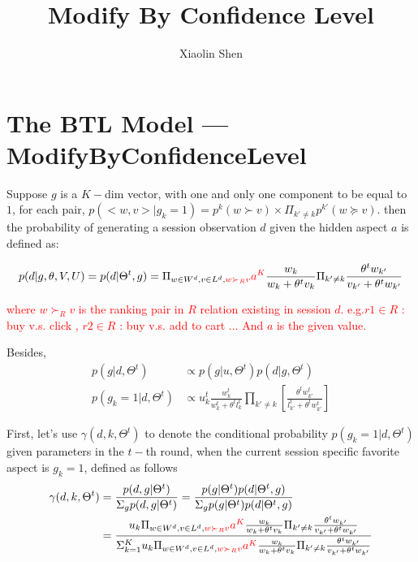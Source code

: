 \documentclass{article}
\title{Modify By Confidence Level}
\author{Xiaolin Shen}
\begin{document}
 

\maketitle


\section{The BTL Model ---ModifyByConfidenceLevel}
 
 Suppose $g$ is a $K-$dim vector, with one and only one component to be equal to $1$, for each pair, $p(<w,v>|g_k=1) = p^k(w\succ v) \times \Pi_{k'\neq k} p^{k'}(w \succeq v)$. then the probability of generating a session observation $d$ given the hidden aspect $a$ is defined as:

\begin{align}\label{equ:skyline}
		p(d|g,\theta,V,U) %
        =p(d|\Theta^t,g)=\Pi_{w \in W^d, v\in L^d,\textcolor{red}{ w \succ_R v}} \textcolor{red}{a^K} \frac{w_k}{w_k+\theta^t v_k}\Pi_{k'\neq k}\frac{\theta^t w_{k'}}{v_{k'}+\theta^t w_{k'}}
\end{align}

\textcolor{red}{where $ w \succ_R v $ is the ranking pair in $R$ relation existing in session $d$. 
 e.g.$ r1 \in R $ : buy v.s. click ,
   $ r2 \in R $ : buy v.s. add to cart  ... And $ a $ is the given value.}

Besides,
\begin{eqnarray}
p(g|d,\Theta^{t}) & \propto   p(g|u,\Theta^{t}) p(d|g,\Theta^{t}) \\ \nonumber
 p(g_k=1|d,\Theta^{t}) & \propto  u_k^{t} \frac{w_{k}^t} {w_{k}^t+\theta^t l_{k}^t} \prod_{k'\neq k}  [\frac{\theta^t w_{k'}^t} {l_{k'}^t + \theta^t w_{k'}^t}]
\end{eqnarray}

First, let's use $\gamma(d,k,\Theta^t)$ to denote the conditional probability $p(g_k=1|d,\Theta^t)$ given parameters in the $t-$th round, when the current session specific favorite aspect is $g_k=1$, defined as follows
\begin{align}\label{equ:conditional}
\gamma(d,k,\Theta^t) &=\frac{p(d,g|\Theta^t)}{\Sigma_g p(d,g|\Theta^t)} = \frac{p(g|\Theta^t)p(d|\Theta^t,g)}{\Sigma_g p(g|\Theta^t)p(d|\Theta^t,g)}\\\nonumber
&=\frac{u_k \Pi_{w \in W^d, v\in L^d,\textcolor{red}{ w \succ_R v}} \textcolor{red}{a^K}\frac{w_k}{w_k+\theta^t v_k}\Pi_{k'\neq k}\frac{\theta^t w_{k'}}{v_{k'}+\theta^t w_{k'}}}{\Sigma_{k=1}^K u_k \Pi_{w \in W^d, v\in L^d,\textcolor{red}{ w \succ_R v}} \textcolor{red}{a^K} \frac{w_k}{w_k+\theta^t v_k}\Pi_{k'\neq k}\frac{\theta^t w_{k'}}{v_{k'}+\theta^t w_{k'}}}
\end{align}
\end{document}
